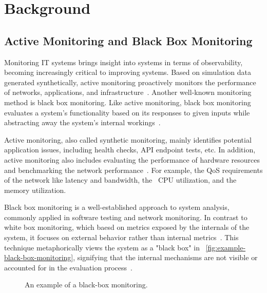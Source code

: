 \usetikzlibrary{positioning,fit,calc,arrows,shapes}

\chapter{Background}\label{chapter:background}

\section{Active Monitoring and Black Box Monitoring}

Monitoring IT systems brings insight into systems in terms of observability, becoming increasingly critical to improving systems. Based on simulation data generated synthetically, active monitoring proactively monitors the performance of networks, applications, and infrastructure~\parencite{splunkActiveVsPassive2023}. Another well-known monitoring method is black box monitoring. Like active monitoring, black box monitoring evaluates a system's functionality based on its responses to given inputs while abstracting away the system's internal workings~\parencite{jorgensenSoftwareTestingCraftsman2021}. 

Active monitoring, also called synthetic monitoring, mainly identifies potential application issues, including health checks, API endpoint tests, etc. In addition, active monitoring also includes evaluating the performance of hardware resources and benchmarking the network performance~\parencite{splunkActiveVsPassive2023}. For example, the \ac{QoS} requirements of the network like latency and bandwidth, the ~\ac{CPU} utilization, and the memory utilization. 

Black box monitoring is a well-established approach to system analysis, commonly applied in software testing and network monitoring. In contrast to white box monitoring, which baesd on metrics exposed by the internals of the system, it focuses on external behavior rather than internal metrics~\parencite{beyerSiteReliabilityEngineering2016}. This technique metaphorically views the system as a "black box" in ~\autoref{fig:example-black-box-monitoring}, signifying that the internal mechanisms are not visible or accounted for in the evaluation process~\parencite{myersArtSoftwareTesting2004}. 

\begin{figure}[htpb]
    \centering
    \caption[Black-box monitoring Example]{An example of a black-box monitoring.}\label{fig:example-black-box-monitoring}
\end{figure}


